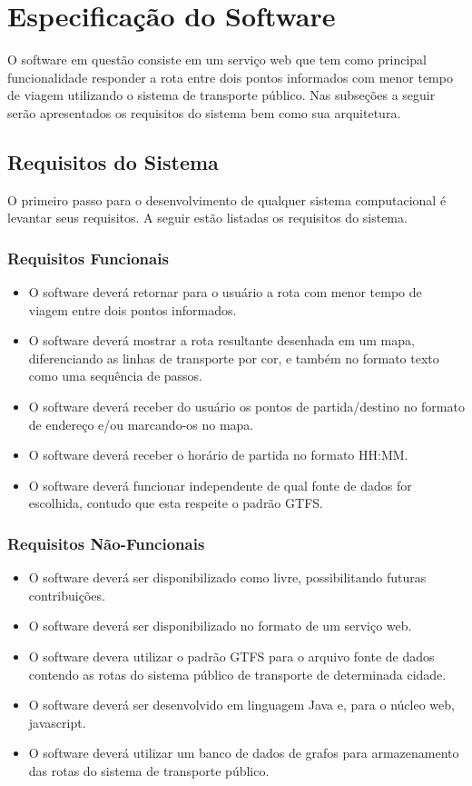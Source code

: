 
\chapter{Especificação do Software}
O software em questão consiste em um serviço web que tem como principal funcionalidade responder a rota entre dois pontos informados com menor tempo de viagem utilizando o sistema de transporte público. 
Nas subseções a seguir serão apresentados os requisitos do sistema bem como sua arquitetura.

\section{Requisitos do Sistema}
O primeiro passo para o desenvolvimento de qualquer sistema computacional é levantar seus requisitos. A seguir estão listadas os requisitos do sistema.

\subsection{Requisitos Funcionais}
\begin{itemize}
	\item O software deverá retornar para o usuário a rota com menor tempo de viagem entre dois pontos informados.
	\item O software deverá mostrar a rota resultante desenhada em um mapa, diferenciando as linhas de transporte por cor, e também no formato texto como uma sequência de passos.
	\item O software deverá receber do usuário os pontos de partida/destino no formato de endereço e/ou marcando-os no mapa.
	\item O software deverá receber o horário de partida no formato HH:MM.
	\item O software deverá funcionar independente de qual fonte de dados for escolhida, contudo que esta respeite o padrão GTFS.
\end{itemize}

\subsection{Requisitos Não-Funcionais}
\begin{itemize}
	\item O software deverá ser disponibilizado como livre, possibilitando futuras contribuições.
	\item O software deverá ser disponibilizado no formato de um serviço web.
	\item O software devera utilizar o padrão GTFS para o arquivo fonte de dados contendo as rotas do sistema público de transporte de determinada cidade.
	\item O software deverá ser desenvolvido em linguagem Java e, para o núcleo web, javascript.
	\item O software deverá utilizar um banco de dados de grafos para armazenamento das rotas do sistema de transporte público.
\end{itemize}

